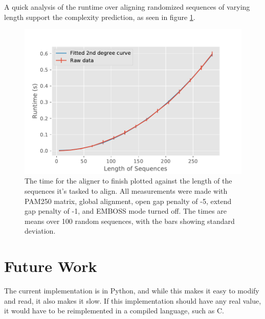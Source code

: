 \documentclass{article}
\begin{document}
A quick analysis of the runtime over aligning randomized sequences of varying length support the complexity prediction, as seen in figure \ref{fig:length_vs_time}.

\begin{figure}[h]
	\includegraphics[width=\columnwidth]{timefig}
	\caption{The time for the aligner to finish plotted against the length of the sequences it's tasked to align. All measurements were made with PAM250 matrix, global alignment, open gap penalty of -5, extend gap penalty of -1, and EMBOSS mode turned off. The times are means over 100 random sequences, with the bars showing standard deviation.}
	\label{fig:length_vs_time}
\end{figure}

\section*{Future Work}
The current implementation is in Python, and while this makes it easy to modify and read, it also makes it slow. If this implementation should have any real value, it would have to be reimplemented in a compiled language, such as C.



\end{document}
